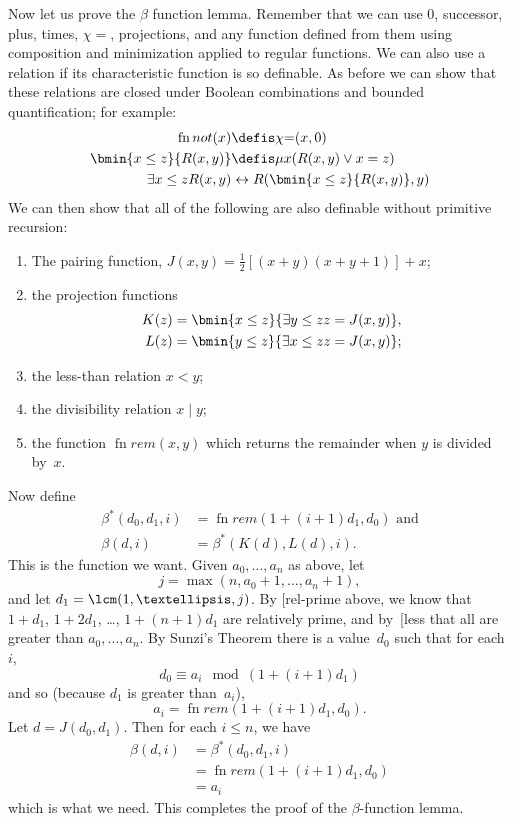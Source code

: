 \documentclass[10pt,a4paper]{article}
\makeatletter
\theoremstyle{plain}
\theoremstyle{definition}
\theoremstyle{remark}
\newcommand{\olref}{\@ifnextchar[{\olref@i}{\olref@final}}
\def\olref@i[#1]{\@ifnextchar[{\olref@ii}{\olref@final}}
\def\olref@ii[#1]{\@ifnextchar[{\olref@iii}{\olref@final}}
\def\olref@iii[#1]{\olref@final}
\def\olref@final#1{\ref{#1}}
\providecommand{\lif}{\mathbin{\rightarrow}}
\providecommand{\Char}{\chi}
\providecommand{\bforall}{\forall}
\providecommand{\bexists}{\exists}
\providecommand{\umin}{\mu}
\providecommand{\defiff}{\mathrel{\leftrightarrow}}
\providecommand{\fn}{\operatorname{fn}}
\makeatother
\begin{document}
Now let us prove the $\beta$ function lemma. Remember that we can use
$0$, successor, plus, times, $\Char{=}$, projections, and any function
defined from them using composition and minimization applied to
regular functions. We can also use a relation if its characteristic
function is so definable. As before we can show that these relations
are closed under Boolean combinations and bounded quantification; for
example:
\begin{align*}
\fn{not}(x) & \defis \Char{=}(x,0)\\
\bmin{x \leq z}{R(x,y)} & \defis \umin{x}{(R(x,y) \lor x = z)}\\
\bexists{x \leq z}{R(x,y)} & \defiff R(\bmin{x \leq z}{R(x,y)}, y)
\end{align*}
We can then show that all of the following are also definable without
primitive recursion:
\begin{enumerate}
\item The pairing function, $J(x,y) = \frac{1}{2}[(x+y)(x+y+1)] + x$;
\item the projection functions
\begin{align*}
K(z) & = \bmin{x \leq z}{\bexists{y \leq z}{z = J(x,y)}},\\
L(z) & = \bmin{y \leq z}{\bexists{x \leq z}{z = J(x,y)}};
\end{align*}
\item the less-than relation $x < y$;
\item the divisibility relation $x \mid y$;
\item the function $\fn{rem}(x,y)$ which returns the remainder when
  $y$ is divided by~$x$.
\end{enumerate}
Now define
\begin{align*}
\beta^*(d_0,d_1,i) & = \fn{rem}(1+(i+1) d_1,d_0) \text{ and}\\
\beta(d,i) & = \beta^*(K(d),L(d),i).
\end{align*}
This is the function we want. Given $a_0,\dots,a_n$ as above, let
\[
j = \max(n,a_0+1,\dots,a_n+1),
\]
and let $d_1 = \lcm(1,\dots,j)$. By \olref{rel-prime} above,
we know that $1+d_1$, $1+2 d_1$, \dots, $1+(n+1) d_1$ are relatively
prime, and by~\olref{less} that all are greater than $a_0,\dots,a_n$.
By Sunzi's Theorem there is a value~$d_0$ such that for each~$i$,
\[
d_0 \equiv a_i \mod (1+(i+1)d_1)
\]
and so (because $d_1$ is greater than~$a_i$),
\[
a_i = \fn{rem}(1+(i+1)d_1,d_0).
\]
Let $d = J(d_0,d_1)$. Then for each $i \le n$, we have
\begin{align*}
\beta(d,i) & =  \beta^*(d_0,d_1,i) \\
& =  \fn{rem}(1+(i+1) d_1,d_0) \\
& =  a_i
\end{align*}
which is what we need. This completes the proof of the
$\beta$-function lemma.
\end{document}
